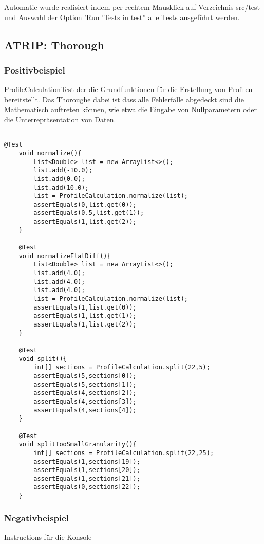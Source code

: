 Automatic wurde realisiert indem per rechtem Mausklick auf Verzeichnis src/test und Auswahl der Option 'Run 'Tests in test'' alle Tests ausgeführt werden.

\subsection{ATRIP: Thorough}

\subsubsection{Positivbeispiel}
ProfileCalculationTest der die Grundfunktionen für die Erstellung von Profilen bereitstellt. Das Thoroughe dabei ist dass alle Fehlerfälle abgedeckt sind die Mathematisch auftreten können, wie etwa die Eingabe von Nullparametern oder die Unterrepräsentation von Daten.

\begin{lstlisting}

@Test
    void normalize(){
        List<Double> list = new ArrayList<>();
        list.add(-10.0);
        list.add(0.0);
        list.add(10.0);
        list = ProfileCalculation.normalize(list);
        assertEquals(0,list.get(0));
        assertEquals(0.5,list.get(1));
        assertEquals(1,list.get(2));
    }

    @Test
    void normalizeFlatDiff(){
        List<Double> list = new ArrayList<>();
        list.add(4.0);
        list.add(4.0);
        list.add(4.0);
        list = ProfileCalculation.normalize(list);
        assertEquals(1,list.get(0));
        assertEquals(1,list.get(1));
        assertEquals(1,list.get(2));
    }

    @Test
    void split(){
        int[] sections = ProfileCalculation.split(22,5);
        assertEquals(5,sections[0]);
        assertEquals(5,sections[1]);
        assertEquals(4,sections[2]);
        assertEquals(4,sections[3]);
        assertEquals(4,sections[4]);
    }

    @Test
    void splitTooSmallGranularity(){
        int[] sections = ProfileCalculation.split(22,25);
        assertEquals(1,sections[19]);
        assertEquals(1,sections[20]);
        assertEquals(1,sections[21]);
        assertEquals(0,sections[22]);
    }

\end{lstlisting}

\subsubsection{Negativbeispiel}
Instructions für die Konsole

